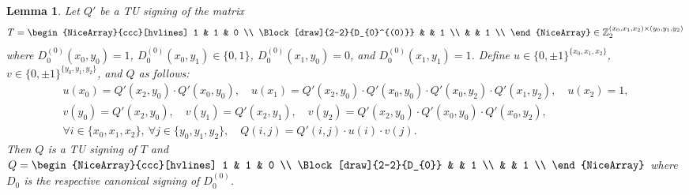 \documentclass{article}
\newtheorem{lemma}{Lemma}
\theoremstyle{definition}
\begin{document}
\begin{lemma}\label{lem:three_sum_signing_helper}
    Let $Q'$ be a TU signing of the matrix
    \[
        T = \begin{NiceArray}{ccc}[hvlines]
            1 & 1 & 0 \\
            \Block[draw]{2-2}{D_{0}^{(0)}} & & 1 \\
             & & 1 \\
        \end{NiceArray} \in \mathbb{Z}_{2}^{(x_{0}, x_{1}, x_{2}) \times (y_{0}, y_{1}, y_{2})}
    \]
    where $D_{0}^{(0)} (x_{0}, y_{0}) = 1$, $D_{0}^{(0)} (x_{0}, y_{1}) \in \{0, 1\}$, $D_{0}^{(0)} (x_{1}, y_{0}) = 0$, and $D_{0}^{(0)} (x_{1}, y_{1}) = 1$. Define $u \in \{0, \pm 1\}^{\{x_{0}, x_{1}, x_{2}\}}$, $v \in \{0, \pm 1\}^{\{y_{0}, y_{1}, y_{2}\}}$, and $Q$ as follows:
    \begin{gather*}
        u(x_{0}) = Q' (x_{2}, y_{0}) \cdot Q' (x_{0}, y_{0}), \quad
        u(x_{1}) = Q' (x_{2}, y_{0}) \cdot Q' (x_{0}, y_{0}) \cdot Q' (x_{0}, y_{2}) \cdot Q' (x_{1}, y_{2}), \quad
        u(x_{2}) = 1, \\
        v(y_{0}) = Q' (x_{2}, y_{0}), \quad
        v(y_{1}) = Q' (x_{2}, y_{1}), \quad
        v(y_{2}) = Q' (x_{2}, y_{0}) \cdot Q' (x_{0}, y_{0}) \cdot Q' (x_{0}, y_{2}), \\
        \forall i \in \{x_{0}, x_{1}, x_{2}\}, \ \forall j \in \{y_{0}, y_{1}, y_{2}\}, \quad Q (i, j) = Q' (i, j) \cdot u(i) \cdot v(j).
    \end{gather*}
    Then $Q$ is a TU signing of $T$ and $Q = \begin{NiceArray}{ccc}[hvlines] 1 & 1 & 0 \\ \Block[draw]{2-2}{D_{0}} & & 1 \\ & & 1 \\ \end{NiceArray}$ where $D_{0}$ is the respective canonical signing of $D_{0}^{(0)}$.
\end{lemma}
\end{document}
